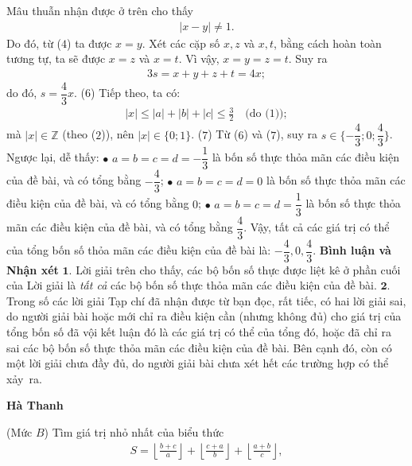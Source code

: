 \begin{multicols}{2}
	\vskip 0.05cm
	Mâu thuẫn nhận được ở trên cho thấy
	\begin{align*}
		|x - y| \ne 1.
	\end{align*}
	Do đó, từ ($4$) ta được $x = y$.
	\vskip 0.05cm
	Xét các cặp số $x, z$ và $x, t$, bằng cách hoàn toàn tương tự, ta sẽ được $x = z$ và $x = t$.
	\vskip 0.05cm
	Vì vậy, $x = y = z = t$. Suy ra
	\begin{align*}
		3s = x  + y + z + t = 4x;
	\end{align*}
	do đó, $s = \dfrac{4}{3}x$. \hfill ($6$)
	\vskip 0.05cm
	Tiếp theo, ta có:
	\begin{align*}
		|x| \le |a| + |b| + |c| \le \frac{3}{2} \quad\text{(do ($1$))}; 
	\end{align*}
	mà $|x| \in \mathbb{Z}$  (theo ($2$)), nên  $|x| \in \{0;1\}$. \hfill ($7$)
	\vskip 0.05cm
	Từ ($6$) và ($7$), suy ra $s \in \{-\dfrac{4}{3}; 0; \dfrac{4}{3}\}$.
	\vskip 0.05cm 
	Ngược lại, dễ thấy:
	\vskip 0.05cm
	$\bullet$ $a=b=c=d = -\dfrac{1}{3}$   là bốn số thực thỏa mãn các điều kiện của đề bài, và có tổng bằng $- \dfrac{4}{3}$;
	\vskip 0.05cm  
	$\bullet$  $a=b=c=d = 0$  là bốn số thực thỏa mãn các điều kiện của đề bài, và có tổng bằng $0$;
	\vskip 0.05cm
	$\bullet$ $a=b=c=d = \dfrac{1}{3}$   là bốn số thực thỏa mãn các điều kiện của đề bài, và có tổng bằng $\dfrac{4}{3}$.
	\vskip 0.05cm  
	Vậy, tất cả các giá trị có thể của tổng bốn số thỏa mãn các điều kiện của đề bài là:  $- \dfrac{4}{3}, 0, \dfrac{4}{3}$.
	\vskip 0.05cm  
	\textbf{\color{thachthuctoanhoc}Bình luận và Nhận xét}
	\vskip 0.05cm
	$\pmb{1.}$ Lời giải trên cho thấy, các bộ bốn số thực được liệt kê ở phần cuối của Lời giải là \textit{tất cả} các bộ bốn số thực thỏa mãn các điều kiện của đề bài.
	\vskip 0.05cm
	$\pmb{2.}$ Trong số các lời giải Tạp chí đã nhận được từ bạn đọc, rất tiếc, có hai lời giải sai, do người giải bài hoặc mới chỉ ra điều kiện cần (nhưng không đủ) cho giá trị của tổng bốn số đã vội kết luận đó là các giá trị có thể của tổng đó, hoặc đã chỉ ra sai các bộ bốn số thực thỏa mãn các điều kiện của đề bài. Bên cạnh đó, còn có một lời giải chưa đầy đủ, do người giải bài chưa xét hết các trường hợp có thể xảy~ra.
	\begin{flushright}
		\textbf{\color{thachthuctoanhoc}Hà Thanh}
	\end{flushright}
	{}
	(Mức $B$)
	Tìm giá trị nhỏ nhất của biểu thức
	\begin{align*}
		S = \left\lfloor {\frac{{b + c}}{a}} \right\rfloor  + \left\lfloor {\frac{{c + a}}{b}} \right\rfloor  + \left\lfloor {\frac{{a + b}}{c}} \right\rfloor ,

\end{align*}
\end{multicols}
